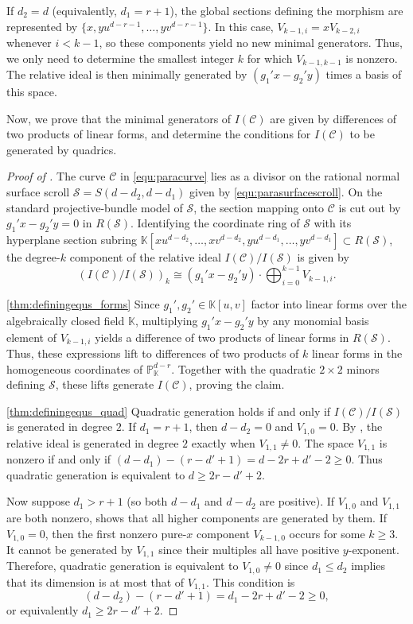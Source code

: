 \documentclass[a4paper, 11pt]{amsart}
\numberwithin{theorem}{section}
\theoremstyle{definition}
\numberwithin{equation}{section}
\begin{document}
If $d_2=d$ (equivalently, $d_1=r+1$), the global sections defining the morphism are represented by $\{x,yu^{d-r-1},\dots,yv^{d-r-1}\}$.
In this case, $V_{k-1,i}=xV_{k-2,i}$ whenever $i<k-1$, so these components yield no new minimal generators.
Thus, we only need to determine the smallest integer $k$ for which $V_{k-1,k-1}$ is nonzero.
The relative ideal is then minimally generated by $(g_1'x-g_2'y)$ times a basis of this space.

Now, we prove that the minimal generators of $I(\mathcal{C})$ are given by differences of two products of linear forms, and determine the conditions for $I(\mathcal{C})$ to be generated by quadrics.
\begin{proof}[Proof of ]
The curve $\mathcal C$ in \eqref{equ:paracurve} lies as a divisor on the rational normal surface scroll $\mathcal S=S(d-d_2,d-d_1)$ given by \eqref{equ:parasurfacescroll}.
On the standard projective-bundle model of $\mathcal S$, the section mapping onto $\mathcal C$ is cut out by $g_1'x-g_2'y=0$ in $R(\mathcal S)$.
Identifying the coordinate ring of $\mathcal{S}$ with its hyperplane section subring $\mathbb{K}[xu^{d-d_2},\dots,xv^{d-d_2},yu^{d-d_1},\dots,yv^{d-d_1}]\subset R(\mathcal{S})$, the degree-$k$ component of the relative ideal $I(\mathcal{C})/I(\mathcal{S})$ is given by
\[
(I(\mathcal{C})/I(\mathcal{S}))_k \cong (g_1'x - g_2'y) \cdot \bigoplus_{i=0}^{k-1} V_{k-1,i}.
\]

\noindent\eqref{thm:definingequs_forms} 
Since $g_1',g_2'\in\mathbb K[u,v]$ factor into linear forms over the algebraically closed field $\mathbb K$, multiplying $g_1'x-g_2'y$ by any monomial basis element of $V_{k-1,i}$ yields a difference of two products of linear forms in $R(\mathcal S)$.
Thus, these expressions lift to differences of two products of $k$ linear forms in the homogeneous coordinates of $\mathbb P_{\mathbb K}^{d-r}$.
Together with the quadratic $2\times2$ minors defining $\mathcal S$, these lifts generate $I(\mathcal C)$, proving the claim.

\medskip
\noindent\eqref{thm:definingequs_quad} 
Quadratic generation holds if and only if $I(\mathcal{C})/I(\mathcal{S})$ is generated in degree $2$. 
If $d_1=r+1$, then $d-d_2=0$ and $V_{1,0}=0$. 
By , the relative ideal is generated in degree $2$ exactly when $V_{1,1} \not= 0$.
The space $V_{1,1}$ is nonzero if and only if $(d-d_1)-(r-d'+1)=d-2r+d'-2\geq0$.
Thus quadratic generation is equivalent to $d\geq2r-d'+2$.

Now suppose $d_1>r+1$ (so both $d-d_1$ and $d-d_2$ are positive).
If $V_{1,0}$ and $V_{1,1}$ are both nonzero,  shows that all higher components are generated by them.
If $V_{1,0}=0$, then the first nonzero pure-$x$ component $V_{k-1,0}$ occurs for some $k \geq 3$. 
It cannot be generated by $V_{1,1}$ since their multiples all have positive $y$-exponent.
Therefore, quadratic generation is equivalent to $V_{1,0}\ne0$ since $d_1\le d_2$ implies that its dimension is at most that of $V_{1,1}$.
This condition is
\[
(d-d_2)-(r-d'+1)=d_1-2r+d'-2\ge0,
\]
or equivalently $d_1\ge2r-d'+2$.
\end{proof}
\end{document}
